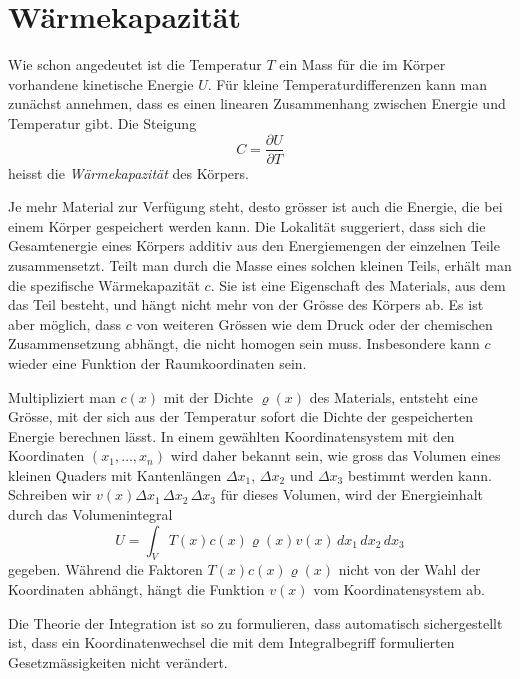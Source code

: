 %
%
%

%
%
\section{Wärmekapazität
\label{buch:fallstudie:waermekapazitaet}}
Wie schon angedeutet ist die Temperatur $T$ ein Mass für die im Körper
vorhandene kinetische Energie $U$.
%
Für kleine Temperaturdifferenzen kann man zunächst annehmen, dass
es einen linearen Zusammenhang zwischen Energie und Temperatur gibt.
Die Steigung 
\[
C
=
\frac{\partial U}{\partial T}
\]
heisst die {\em Wärmekapazität} des Körpers.
%

Je mehr Material zur Verfügung steht, desto grösser ist auch die Energie,
die bei einem Körper gespeichert werden kann.
Die Lokalität suggeriert, dass sich die Gesamtenergie eines Körpers 
additiv aus den Energiemengen der einzelnen Teile zusammensetzt.
Teilt man durch die Masse eines solchen kleinen Teils, erhält man die
spezifische Wärmekapazität $c$.
Sie ist eine Eigenschaft des Materials, aus dem das Teil besteht,
und hängt nicht mehr von der Grösse des Körpers ab.
Es ist aber möglich, dass $c$ von weiteren Grössen wie dem Druck oder der
chemischen Zusammensetzung abhängt, die nicht homogen sein muss.
Insbesondere kann $c$ wieder eine Funktion der Raumkoordinaten sein.

Multipliziert man $c(x)$ mit der Dichte $\varrho(x)$ des Materials,
%
entsteht eine Grösse, mit der sich aus der Temperatur sofort die
Dichte der gespeicherten Energie berechnen lässt.
In einem gewählten Koordinatensystem mit den Koordinaten $(x_1,\dots,x_n)$
wird daher bekannt sein, wie gross das Volumen eines kleinen
Quaders mit Kantenlängen $\Delta x_1$, $\Delta x_2$ und $\Delta x_3$ 
bestimmt werden kann.
Schreiben wir $v(x) \Delta x_1\,\Delta x_2\,\Delta x_3$ für dieses 
Volumen, wird der Energieinhalt durch das Volumenintegral
\[
U
=
\int_V T(x) c(x)\varrho(x) v(x)\,dx_1\,dx_2\,dx_3
\]
gegeben.
Während die Faktoren $T(x) c(x) \varrho(x)$ nicht von der Wahl der
Koordinaten abhängt, hängt die Funktion $v(x)$ vom Koordinatensystem
ab.

\begin{aufgabe}
Die Theorie der Integration ist so zu formulieren, dass automatisch
sichergestellt ist, dass ein Koordinatenwechsel die mit dem Integralbegriff
formulierten Gesetzmässigkeiten nicht verändert.
\end{aufgabe}

